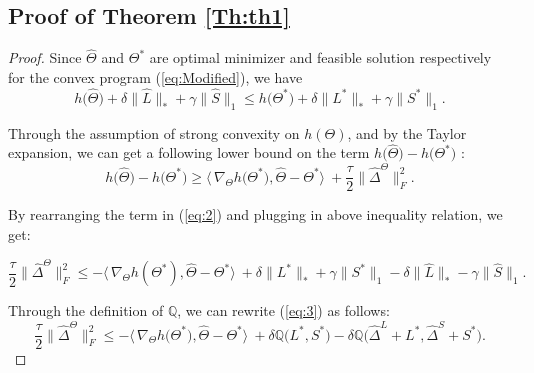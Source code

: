 \documentclass[AMS,STIX1COL]{WileyNJD-v2}
\begin{document}
{\subsection{Proof of Theorem \ref{Th:th1}} \label{App:Theorem1}
\begin{proof}
Since $\widehat{\Theta}$ and $\Theta^{*}$ are optimal minimizer and feasible solution respectively for the convex program (\ref{eq:Modified}), we have
\begin{equation}\label{eq:2}
    h\big(\widehat{\Theta}\big) + \delta\big\|\widehat{L}\big\|_{*} + \gamma\big\|\widehat{S}\big\|_{1} \leq
     h\big(\Theta^{*}\big) + \delta\big\|{L^{*}}\big\|_{*} + \gamma\big\|{S}^{*}\big\|_{1}.
\end{equation}

Through the assumption of strong convexity on $h(\Theta)$, and by the Taylor expansion, we can get a following lower bound on the term $h\big(\widehat{\Theta}\big)-h\big(\Theta^{*}\big)$ :
\[
h\big(\widehat{\Theta}\big)-h\big(\Theta^{*}\big) \geq
\big\langle\, \nabla_{\Theta}h\big(\Theta^{*}\big),\widehat{\Theta}-\Theta^{*}\big\rangle\ + \frac{\tau}{2}\big\|\widehat{\Delta}^{\Theta}\big\|_{F}^{2}.
\]

By rearranging the term in (\ref{eq:2}) and plugging in above inequality relation, we get:

\begin{equation}\label{eq:3}
    \frac{\tau}{2}\big\|\widehat{\Delta}^{\Theta}\big\|_{F}^{2} \leq
    -\big\langle\,\nabla_{\Theta}h(\Theta^{*}),\widehat{\Theta}-\Theta^{*}\big\rangle\
    + \delta \big\|L^{*}\big\|_\ast + \gamma \big\|S^{*}\big\|_1
    - \delta \big\|\widehat{L}\big\|_\ast - \gamma \big\|\widehat{S}\big\|_1.
\end{equation}

Through the definition of $\mathbb{Q}$, we can rewrite (\ref{eq:3}) as follows:
\begin{equation}\label{eq:4}
    \frac{\tau}{2}\big\|\widehat{\Delta}^{\Theta}\big\|_{F}^{2} \leq
    -\big\langle\,\nabla_{\Theta}h\big(\Theta^{*}\big),\widehat{\Theta}-\Theta^{*}\big\rangle\
    + \delta \mathbb{Q}\big(L^{*},S^{*}\big) - \delta \mathbb{Q}\big(\widehat{\Delta}^L + L^{*},\widehat{\Delta}^S + S^{*}\big).
\end{equation}


\end{proof}}
\end{document}
